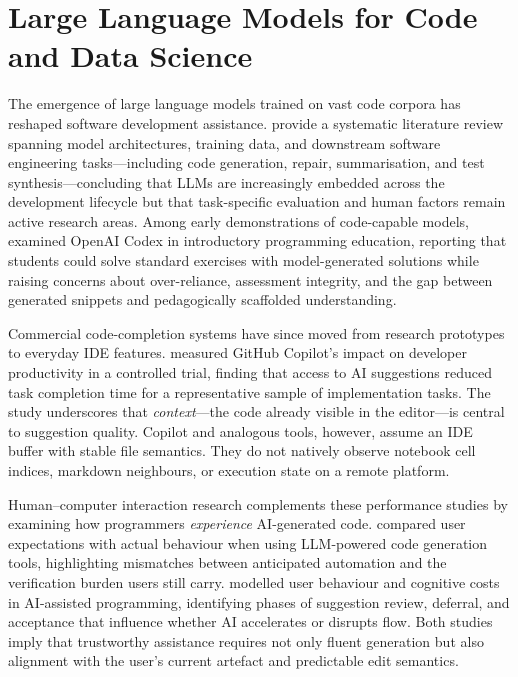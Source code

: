 \section{Large Language Models for Code and Data Science}
\label{sec:lit-llm-code}

The emergence of large language models trained on vast code corpora has reshaped software development assistance. \textcite{hou2024llm4se} provide a systematic literature review spanning model architectures, training data, and downstream software engineering tasks---including code generation, repair, summarisation, and test synthesis---concluding that \acp{LLM} are increasingly embedded across the development lifecycle but that task-specific evaluation and human factors remain active research areas. Among early demonstrations of code-capable models, \textcite{finnieansley2022codex} examined OpenAI Codex in introductory programming education, reporting that students could solve standard exercises with model-generated solutions while raising concerns about over-reliance, assessment integrity, and the gap between generated snippets and pedagogically scaffolded understanding.

Commercial code-completion systems have since moved from research prototypes to everyday IDE features. \textcite{ziegler2024copilot} measured GitHub Copilot's impact on developer productivity in a controlled trial, finding that access to AI suggestions reduced task completion time for a representative sample of implementation tasks. The study underscores that \emph{context}---the code already visible in the editor---is central to suggestion quality. Copilot and analogous tools, however, assume an IDE buffer with stable file semantics. They do not natively observe notebook cell indices, markdown neighbours, or execution state on a remote platform.

Human--computer interaction research complements these performance studies by examining how programmers \emph{experience} AI-generated code. \textcite{vaithilingam2022expectation} compared user expectations with actual behaviour when using LLM-powered code generation tools, highlighting mismatches between anticipated automation and the verification burden users still carry. \textcite{mozannar2024reading} modelled user behaviour and cognitive costs in AI-assisted programming, identifying phases of suggestion review, deferral, and acceptance that influence whether AI accelerates or disrupts flow. Both studies imply that trustworthy assistance requires not only fluent generation but also alignment with the user's current artefact and predictable edit semantics.

